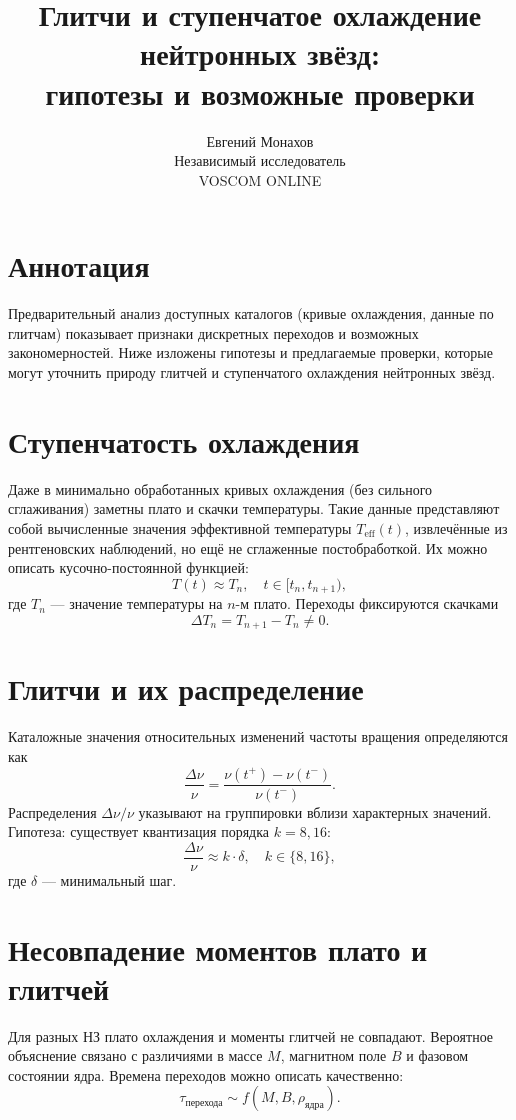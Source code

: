 \documentclass[a4paper,12pt]{article}
\title{Глитчи и ступенчатое охлаждение нейтронных звёзд:\\
гипотезы и возможные проверки}
\author{Евгений Монахов \\ Независимый исследователь \\ VOSCOM ONLINE}
\date{}
\begin{document}
\maketitle

\section*{Аннотация}
Предварительный анализ доступных каталогов (кривые охлаждения, данные по глитчам)
показывает признаки дискретных переходов и возможных закономерностей.
Ниже изложены гипотезы и предлагаемые проверки, которые могут уточнить природу
глитчей и ступенчатого охлаждения нейтронных звёзд.

\section{Ступенчатость охлаждения}
Даже в минимально обработанных кривых охлаждения (без сильного сглаживания)
заметны плато и скачки температуры. Такие данные представляют собой 
вычисленные значения эффективной температуры $T_{\mathrm{eff}}(t)$,
извлечённые из рентгеновских наблюдений, но ещё не сглаженные постобработкой.  
Их можно описать кусочно-постоянной функцией:
\[
T(t) \approx T_n, \quad t \in [t_n, t_{n+1}),
\]
где $T_n$ --- значение температуры на $n$-м плато.
Переходы фиксируются скачками
\[
\Delta T_n = T_{n+1} - T_n \neq 0.
\]

\section{Глитчи и их распределение}
Каталожные значения относительных изменений частоты вращения определяются как
\[
\frac{\Delta \nu}{\nu} = \frac{\nu(t^{+}) - \nu(t^{-})}{\nu(t^{-})}.
\]
Распределения $\Delta\nu/\nu$ указывают на группировки вблизи характерных значений.
Гипотеза: существует квантизация порядка $k=8,16$:
\[
\frac{\Delta \nu}{\nu} \approx k \cdot \delta, \quad k \in \{8,16\},
\]
где $\delta$ --- минимальный шаг.

\section{Несовпадение моментов плато и глитчей}
Для разных НЗ плато охлаждения и моменты глитчей не совпадают.
Вероятное объяснение связано с различиями в массе $M$, магнитном поле $B$
и фазовом состоянии ядра. Времена переходов можно описать качественно:
\[
\tau_{\text{перехода}} \sim f(M,B,\rho_{\text{ядра}}).
\]
\end{document}
